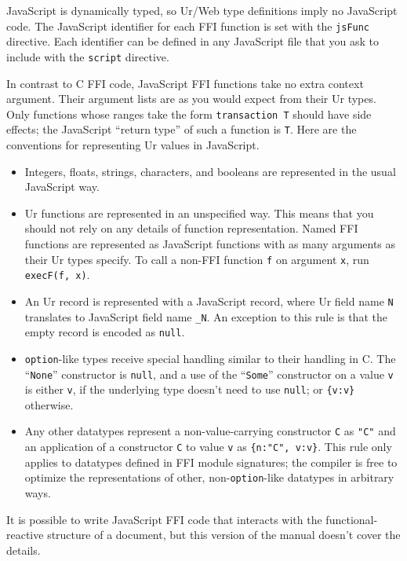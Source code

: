 \documentclass{article}
\begin{document}
JavaScript is dynamically typed, so Ur/Web type definitions imply no JavaScript code.  The JavaScript identifier for each FFI function is set with the \texttt{jsFunc} directive.  Each identifier can be defined in any JavaScript file that you ask to include with the \texttt{script} directive.

In contrast to C FFI code, JavaScript FFI functions take no extra context argument.  Their argument lists are as you would expect from their Ur types.  Only functions whose ranges take the form \texttt{transaction T} should have side effects; the JavaScript ``return type'' of such a function is \texttt{T}.  Here are the conventions for representing Ur values in JavaScript.

\begin{itemize}
\item Integers, floats, strings, characters, and booleans are represented in the usual JavaScript way.
\item Ur functions are represented in an unspecified way.  This means that you should not rely on any details of function representation.  Named FFI functions are represented as JavaScript functions with as many arguments as their Ur types specify.  To call a non-FFI function \texttt{f} on argument \texttt{x}, run \texttt{execF(f, x)}.
\item An Ur record is represented with a JavaScript record, where Ur field name \texttt{N} translates to JavaScript field name \texttt{\_N}.  An exception to this rule is that the empty record is encoded as \texttt{null}.
\item \texttt{option}-like types receive special handling similar to their handling in C.  The ``\texttt{None}'' constructor is \texttt{null}, and a use of the ``\texttt{Some}'' constructor on a value \texttt{v} is either \texttt{v}, if the underlying type doesn't need to use \texttt{null}; or \texttt{\{v:v\}} otherwise.
\item Any other datatypes represent a non-value-carrying constructor \texttt{C} as \texttt{"C"} and an application of a constructor \texttt{C} to value \texttt{v} as \texttt{\{n:"C", v:v\}}.  This rule only applies to datatypes defined in FFI module signatures; the compiler is free to optimize the representations of other, non-\texttt{option}-like datatypes in arbitrary ways.
\end{itemize}

It is possible to write JavaScript FFI code that interacts with the functional-reactive structure of a document, but this version of the manual doesn't cover the details.
\end{document}
